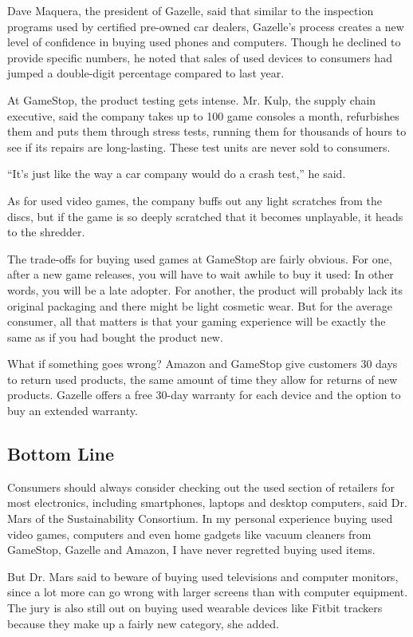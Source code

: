 Dave Maquera, the president of Gazelle, said that similar to the
inspection programs used by certified pre-owned car dealers, Gazelle's
process creates a new level of confidence in buying used phones and
computers. Though he declined to provide specific numbers, he noted that
sales of used devices to consumers had jumped a double-digit percentage
compared to last year.

At GameStop, the product testing gets intense. Mr. Kulp, the supply
chain executive, said the company takes up to 100 game consoles a month,
refurbishes them and puts them through stress tests, running them for
thousands of hours to see if its repairs are long-lasting. These test
units are never sold to consumers.

``It's just like the way a car company would do a crash test,'' he said.

As for used video games, the company buffs out any light scratches from
the discs, but if the game is so deeply scratched that it becomes
unplayable, it heads to the shredder.

The trade-offs for buying used games at GameStop are fairly obvious. For
one, after a new game releases, you will have to wait awhile to buy it
used: In other words, you will be a late adopter. For another, the
product will probably lack its original packaging and there might be
light cosmetic wear. But for the average consumer, all that matters is
that your gaming experience will be exactly the same as if you had
bought the product new.

What if something goes wrong? Amazon and GameStop give customers 30 days
to return used products, the same amount of time they allow for returns
of new products. Gazelle offers a free 30-day warranty for each device
and the option to buy an extended warranty.

\hypertarget{bottom-line}{%
\subsection{Bottom Line}\label{bottom-line}}

Consumers should always consider checking out the used section of
retailers for most electronics, including smartphones, laptops and
desktop computers, said Dr. Mars of the Sustainability Consortium. In my
personal experience buying used video games, computers and even home
gadgets like vacuum cleaners from GameStop, Gazelle and Amazon, I have
never regretted buying used items.

But Dr. Mars said to beware of buying used televisions and computer
monitors, since a lot more can go wrong with larger screens than with
computer equipment. The jury is also still out on buying used wearable
devices like Fitbit trackers because they make up a fairly new category,
she added.

